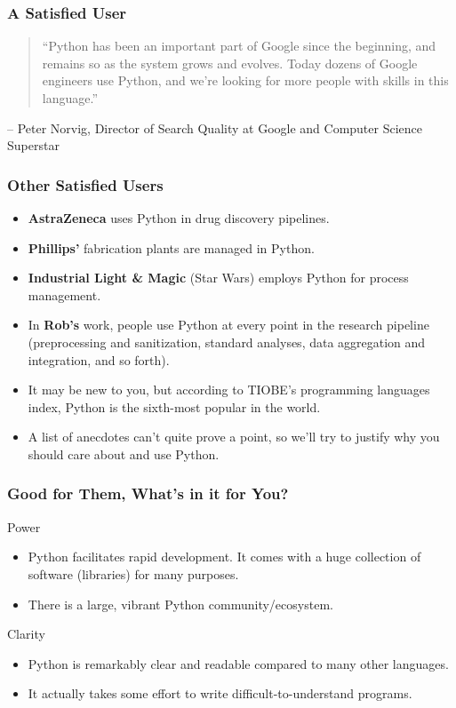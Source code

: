 \documentclass[10pt]{beamer}
\begin{document}
\begin{frame}
  \frametitle{A Satisfied User}
  \small
  \begin{quote}
      ``Python has been an important part of Google since the beginning, and remains so as the system grows and evolves. Today dozens of Google engineers use Python, and we're looking for more people with skills in this language.''
  \end{quote}
  \begin{flushright}
    -- Peter Norvig, Director of Search Quality at Google and Computer Science Superstar
  \end{flushright}
\end{frame}

\begin{frame}
  \frametitle{Other Satisfied Users}
  \begin{itemize}
    \item \textbf{AstraZeneca} uses Python in drug discovery pipelines.
    \item \textbf{Phillips'} fabrication plants are managed in Python.
    \item \textbf{Industrial Light \& Magic} (Star Wars) employs Python for process management.
    \item In \textbf{Rob's} work, people use Python at every point in the research pipeline (preprocessing and sanitization, standard analyses, data aggregation and integration, and so forth).
    \item It may be new to you, but according to TIOBE's programming languages index, Python is the sixth-most popular in the world.
    \item A list of anecdotes can't quite prove a point, so we'll try to justify why you should care about and use Python.
  \end{itemize}
\end{frame}

\begin{frame}
  \frametitle{Good for Them, What's in it for You?}
  \begin{block}{Power}
    \begin{itemize}
      \item Python facilitates rapid development.
        It comes with a huge collection of software (libraries) for many purposes.
      \item There is a large, vibrant Python community/ecosystem.
    \end{itemize}
  \end{block}
  \begin{block}{Clarity}
    \begin{itemize}
      \item Python is remarkably clear and readable compared to many other languages.
      \item It actually takes some effort to write difficult-to-understand programs.
    \end{itemize}
  \end{block}
\end{frame}
\end{document}
